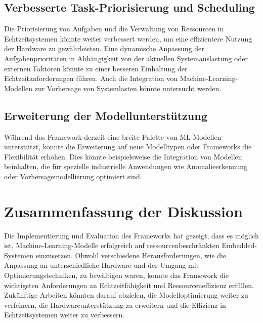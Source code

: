 \subsection{Verbesserte Task-Priorisierung und Scheduling}
Die Priorisierung von Aufgaben und die Verwaltung von Ressourcen in Echtzeitsystemen könnte weiter verbessert werden, 
um eine effizientere Nutzung der Hardware zu gewährleisten. Eine dynamische Anpassung der Aufgabenprioritäten in Abhängigkeit von 
der aktuellen Systemauslastung oder externen Faktoren könnte zu einer besseren Einhaltung der Echtzeitanforderungen führen. 
Auch die Integration von Machine-Learning-Modellen zur Vorhersage von Systemlasten könnte untersucht werden.

\subsection{Erweiterung der Modellunterstützung}
Während das Framework derzeit eine breite Palette von ML-Modellen unterstützt, könnte die Erweiterung auf neue Modelltypen oder 
Frameworks die Flexibilität erhöhen. Dies könnte beispielsweise die Integration von Modellen beinhalten, die für spezielle 
industrielle Anwendungen wie Anomalieerkennung oder Vorhersagemodellierung optimiert sind.

\section{Zusammenfassung der Diskussion}
Die Implementierung und Evaluation des Frameworks hat gezeigt, dass es möglich ist, Machine-Learning-Modelle erfolgreich auf 
ressourcenbeschränkten Embedded-Systemen einzusetzen. Obwohl verschiedene Herausforderungen, wie die Anpassung an unterschiedliche Hardware 
und der Umgang mit Optimierungstechniken, zu bewältigen waren, konnte das Framework die wichtigsten Anforderungen an Echtzeitfähigkeit 
und Ressourceneffizienz erfüllen. Zukünftige Arbeiten könnten darauf abzielen, die Modelloptimierung weiter zu verfeinern, 
die Hardwareunterstützung zu erweitern und die Effizienz in Echtzeitsystemen weiter zu verbessern.